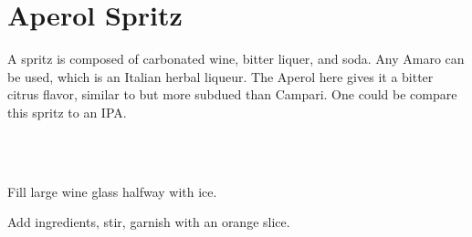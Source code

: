 \section[Aperol Spritz]{
    Aperol Spritz
}

\begin{recipestats}[
        servings=1,
        preptime=5 \minute,
        original=\citefield{cocktailSeminars2021}{title} \cite{cocktailSeminars2021},
    ]
\end{recipestats}

\begin{recipeabstract}
    A spritz is composed of carbonated wine, bitter liquer, and soda.
    Any Amaro can be used, which is an Italian herbal liqueur.
    The Aperol here gives it a bitter citrus flavor, similar to but more
    subdued than Campari.
    One could be compare this spritz to an IPA.
\end{recipeabstract}

\begin{ingredientcolumns}
    \begin{ingredientblock}
        \\
        \\
    \end{ingredientblock}
    \begin{ingredientblock}
    \end{ingredientblock}
\end{ingredientcolumns}

\begin{preparation}
\item Fill large wine glass halfway with ice.
\item Add ingredients, stir, garnish with an orange slice.
\end{preparation}

\recipeend
